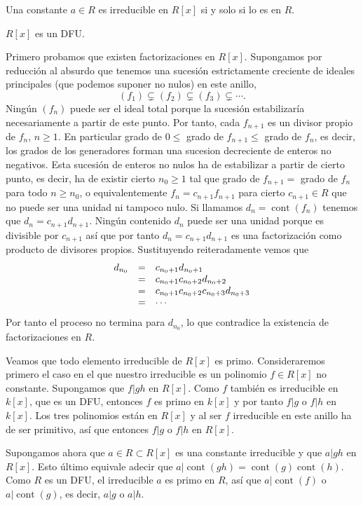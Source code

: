 
Una constante \(a\in R\) es irreducible en \(R[x]\) si y solo si lo es
en \(R\). 


\(R[x]\) es un DFU. 


Primero probamos que existen factorizaciones en \(R[x]\). Supongamos por
reducción al absurdo que tenemos una sucesión estrictamente creciente de
ideales principales (que podemos suponer no nulos) en este anillo,
\[(f_1)\subsetneq (f_2)\subsetneq (f_3)\subsetneq\cdots.\] Ningún
\((f_n)\) puede ser el ideal total porque la sucesión estabilizaría
necesariamente a partir de este punto. Por tanto, cada \(f_{n+1}\) es
un divisor propio de \(f_{n}\), \(n\geq 1\). En particular grado de
\(0\leq\) grado de \(f_{n+1}\leq\) grado de \(f_{n}\), es decir, los
grados de los generadores forman una sucesion decreciente de enteros no
negativos. Esta sucesión de enteros no nulos ha de estabilizar a partir
de cierto punto, es decir, ha de existir cierto \(n_0\geq 1\) tal que
grado de \(f_{n+1}=\) grado de \(f_{n}\) para todo \(n\geq n_0\), o
equivalentemente \(f_n=c_{n+1}f_{n+1}\) para cierto \(c_{n+1}\in R\)
que no puede ser una unidad ni tampoco nulo. Si llamamos
\(d_n=\operatorname{cont}(f_n)\) tenemos que
\(d_n=c_{n+1}d_{n+1}\). Ningún contenido \(d_n\) puede ser una
unidad porque es divisible por \(c_{n+1}\) así que por tanto
\(d_n=c_{n+1}d_{n+1}\) es una factorización como producto de
divisores propios. Sustituyendo reiteradamente vemos que \[
\begin{array}{rcl}
d_{n_0}&=& c_{n_0+1}d_{n_0+1}\cr
&=& c_{n_0+1}c_{n_0+2}d_{n_0+2}\cr
&=& c_{n_0+1}c_{n_0+2}c_{n_0+3}d_{n_0+3}\cr
&=&\cdots
\end{array}
\] Por tanto el proceso no termina para \(d_{n_0}\), lo que contradice
la existencia de factorizaciones en \(R\).

Veamos que todo elemento irreducible de \(R[x]\) es primo.
Consideraremos primero el caso en el que nuestro irreducible es un
polinomio \(f\in R[x]\) no constante. Supongamos que \(f|gh\) en
\(R[x]\). Como \(f\) también es irreducible en \(k[x]\), que es un DFU,
entonces \(f\) es primo en \(k[x]\) y por tanto \(f|g\) o \(f|h\) en
\(k[x]\). Los tres polinomios están en \(R[x]\) y al ser \(f\)
irreducible en este anillo ha de ser primitivo, así que entonces \(f|g\)
o \(f|h\) en \(R[x]\).

Supongamos ahora que \(a\in R\subset R[x]\) es una constante irreducible
y que \(a|gh\) en \(R[x]\). Esto último equivale adecir que
\(a|\operatorname{cont}(gh)=\operatorname{cont}(g)\operatorname{cont}(h)\).
Como \(R\) es un DFU, el irreducible \(a\) es primo en \(R\), así que
\(a|\operatorname{cont}(f)\) o \(a|\operatorname{cont}(g)\), es decir,
\(a|g\) o \(a|h\). 

